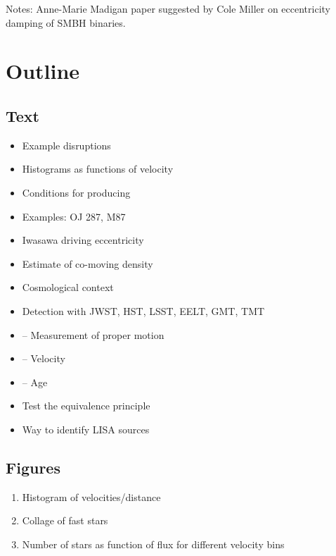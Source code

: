 \documentclass[a4paper,twocolumn]{emulateapj}
\begin{document}
Notes: Anne-Marie Madigan paper suggested by Cole Miller on eccentricity damping of SMBH binaries.

\setcounter{section}{-1}
\section{Outline}
\subsection{Text}

\begin{itemize}
\item Example disruptions
\item Histograms as functions of velocity
\item Conditions for producing
\item Examples: OJ 287, M87
\item Iwasawa driving eccentricity
\item Estimate of co-moving density
\item Cosmological context
\item Detection with JWST, HST, LSST, EELT, GMT, TMT
\item -- Measurement of proper motion
\item -- Velocity
\item -- Age
\item Test the equivalence principle
\item Way to identify LISA sources
\end{itemize}

\subsection{Figures}
\begin{enumerate}
\item Histogram of velocities/distance
\item Collage of fast stars
\item Number of stars as function of flux for different velocity bins
\end{enumerate}
\end{document}
